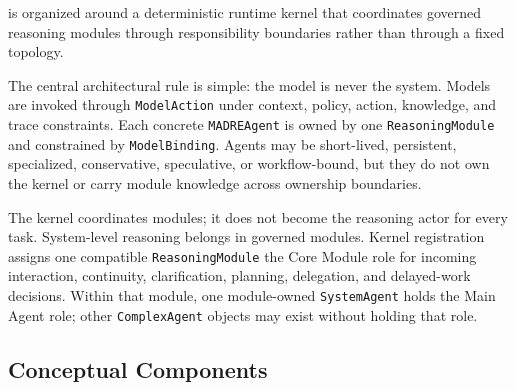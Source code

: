 \Madre is organized around a deterministic runtime kernel that coordinates governed reasoning modules through responsibility boundaries rather than through a fixed topology.

The central architectural rule is simple: the model is never the system. Models are invoked through \texttt{ModelAction} under context, policy, action, knowledge, and trace constraints. Each concrete \texttt{MADREAgent} is owned by one \texttt{ReasoningModule} and constrained by \texttt{ModelBinding}. Agents may be short-lived, persistent, specialized, conservative, speculative, or workflow-bound, but they do not own the kernel or carry module knowledge across ownership boundaries.

The kernel coordinates modules; it does not become the reasoning actor for every task. System-level reasoning belongs in governed modules. Kernel registration assigns one compatible \texttt{ReasoningModule} the Core Module role for incoming interaction, continuity, clarification, planning, delegation, and delayed-work decisions. Within that module, one module-owned \texttt{SystemAgent} holds the Main Agent role; other \texttt{ComplexAgent} objects may exist without holding that role.

\subsection{Conceptual Components}

